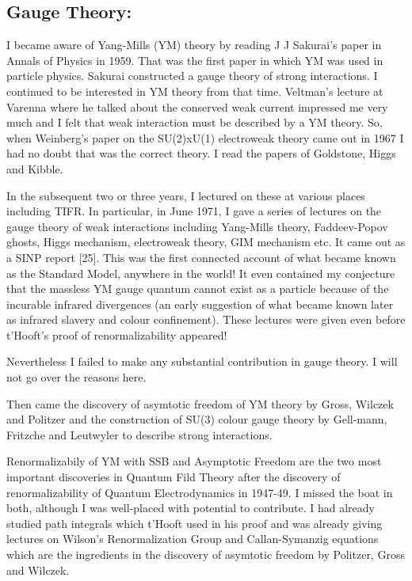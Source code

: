 \subsection*{Gauge Theory: }

I became aware of Yang-Mills (YM) theory by reading J J Sakurai's paper 
in Annals of Physics in 1959. That was the first paper in which YM was 
used in particle physics. Sakurai constructed a gauge theory of strong 
interactions. I continued to be interested in YM theory from that time. 
Veltman's lecture at Varenna where he talked about the conserved weak 
current impressed me very much and I felt that weak interaction must be 
described by a YM theory. So, when Weinberg's paper on the SU(2)xU(1) 
electroweak theory came out in 1967 I had no doubt that was the correct 
theory. I read the papers of Goldstone, Higgs and Kibble.

In the subsequent two or three years, I lectured on these at various 
places including TIFR. In particular, in June 1971, I gave a series of 
lectures on the gauge theory of weak interactions including Yang-Mills 
theory, Faddeev-Popov ghosts, Higgs mechanism, electroweak theory, GIM 
mechanism etc. It came out as a SINP report [25]. This was the first 
connected account of what became known as the Standard Model, anywhere 
in the world! It even contained my conjecture that the massless YM gauge 
quantum cannot exist as a particle because of the incurable infrared 
divergences (an early suggestion of what became known later as infrared 
slavery and colour confinement). These lectures were given even before 
t'Hooft's proof of renormalizability appeared!

Nevertheless I failed to make any substantial contribution in gauge 
theory. I will not go over the reasons here.

Then came the discovery of asymtotic freedom of YM theory by Gross, 
Wilczek and Politzer and the construction of SU(3) colour gauge theory 
by Gell-mann, Fritzche and Leutwyler to describe strong interactions.

Renormalizabily of YM with SSB and Asymptotic Freedom are the two most 
important discoveries in Quantum Fild Theory after the discovery of 
renormalizability of Quantum Electrodynamics in 1947-49. I missed the 
boat in both, although I was well-placed with potential to contribute. I 
had already studied path integrals which t'Hooft used in his proof and 
was already giving lectures on Wilson's Renormalization Group and 
Callan-Symanzig equations which are the ingredients in the discovery of 
asymtotic freedom by Politzer, Gross and Wilczek.


